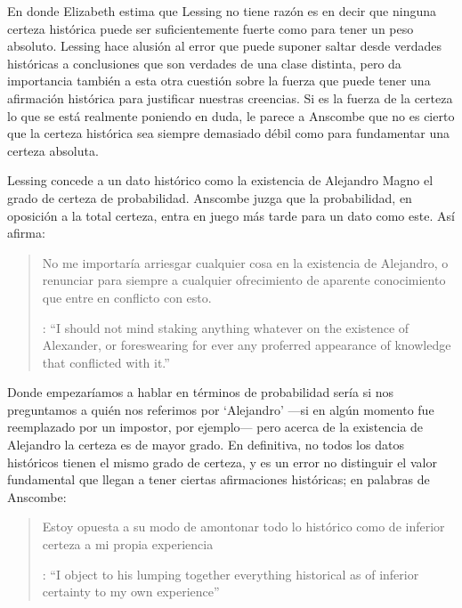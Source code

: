 En donde Elizabeth estima que Lessing no tiene razón es en decir que ninguna certeza histórica puede ser suficientemente fuerte como para tener un peso absoluto. Lessing hace alusión al error que puede suponer saltar desde verdades históricas a conclusiones que son verdades de una clase distinta, pero da importancia también a esta otra cuestión sobre la fuerza que puede tener una afirmación histórica para justificar nuestras creencias. Si es la fuerza de la certeza lo que se está realmente poniendo en duda, le parece a Anscombe que no es cierto que la certeza histórica sea siempre demasiado débil como para fundamentar una certeza absoluta.

Lessing concede a un dato histórico como la existencia de Alejandro Magno el grado de certeza de probabilidad. Anscombe juzga que la probabilidad, en oposición a la total certeza, entra en juego más tarde para un dato como este. Así afirma: \blockquote[{\cite[26]{anscombe2008faith:prophandmi}}: \enquote{I should not mind staking anything whatever on the existence of Alexander, or foreswearing for ever any proferred appearance of knowledge that conflicted with it.}]{No me importaría arriesgar cualquier cosa en la existencia de Alejandro, o renunciar para siempre a cualquier ofrecimiento de aparente conocimiento que entre en conflicto con esto.} Donde empezaríamos a hablar en términos de probabilidad sería si nos preguntamos a quién nos referimos por `Alejandro' ---si en algún momento fue reemplazado por un impostor, por ejemplo--- pero acerca de la existencia de Alejandro la certeza es de mayor grado. En definitiva, no todos los datos históricos tienen el mismo grado de certeza, y es un error no distinguir el valor fundamental que llegan a tener ciertas afirmaciones históricas; en palabras de Anscombe: \blockquote[{\cite[27]{anscombe2008faith:prophandmi}}: \enquote{I object to his lumping together everything historical as of inferior certainty to my own experience}]{Estoy opuesta a su modo de amontonar todo lo histórico como de inferior certeza a mi propia experiencia}.

